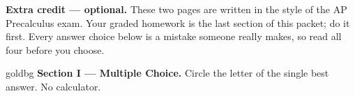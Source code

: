 \documentclass[10pt]{article}
\begin{document}

\vspace{0.12in}

\boxguard[8]
\begin{remindbox}
\small
\textbf{Extra credit --- optional.} These two pages are written in the style of the AP
Precalculus exam. Your graded homework is the last section of this packet; do it first. Every
answer choice below is a mistake someone really makes, so read all four before you choose.
\end{remindbox}

\vspace{0.12in}

\begin{headlinebox}{goldbg}
\small
\textbf{Section I --- Multiple Choice.} Circle the letter of the single best answer. No calculator.
\end{headlinebox}

\vspace{0.06in}
\end{document}
